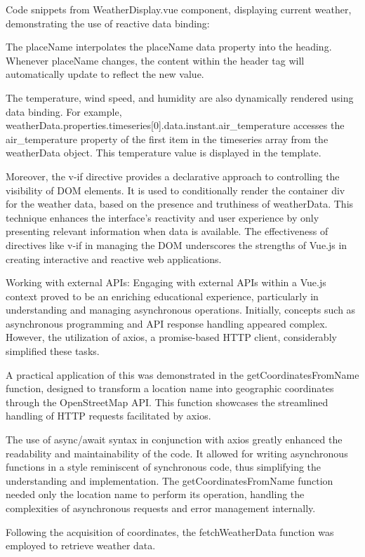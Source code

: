Code snippets from WeatherDisplay.vue component, displaying current weather, demonstrating the use of reactive data binding: 

The {{ placeName }} interpolates the placeName data property into the heading. Whenever placeName changes, the content within the header tag will automatically update to reflect the new value.

The temperature, wind speed, and humidity are also dynamically rendered using data binding. 
For example, {{ weatherData.properties.timeseries[0].data.instant.air_temperature }} accesses the air_temperature property of the first item in the timeseries array from the weatherData object. This temperature value is displayed in the template.

Moreover, the v-if directive provides a declarative approach to controlling the visibility of DOM elements. It is used to conditionally render the container div for the weather data, based on the presence and truthiness of weatherData. This technique enhances the interface's reactivity and user experience by only presenting relevant information when data is available. The effectiveness of directives like v-if in managing the DOM underscores the strengths of Vue.js in creating interactive and reactive web applications.

Working with external APIs:
Engaging with external APIs within a Vue.js context proved to be an enriching educational experience, particularly in understanding and managing asynchronous operations. Initially, concepts such as asynchronous programming and API response handling appeared complex. However, the utilization of axios, a promise-based HTTP client, considerably simplified these tasks.

A practical application of this was demonstrated in the getCoordinatesFromName function, designed to transform a location name into geographic coordinates through the OpenStreetMap API. This function showcases the streamlined handling of HTTP requests facilitated by axios.

The use of async/await syntax in conjunction with axios greatly enhanced the readability and maintainability of the code. It allowed for writing asynchronous functions in a style reminiscent of synchronous code, thus simplifying the understanding and implementation. The getCoordinatesFromName function needed only the location name to perform its operation, handling the complexities of asynchronous requests and error management internally.

Following the acquisition of coordinates, the fetchWeatherData function was employed to retrieve weather data. 

